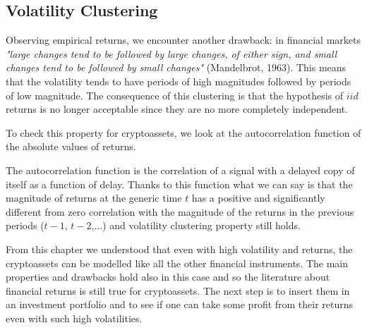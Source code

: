 \subsection{Volatility Clustering}
Observing empirical returns, we encounter another drawback: in financial markets \textit{"large changes tend to be followed by large changes, of either sign, and small changes tend to be followed by small changes"} (Mandelbrot, 1963). This means that the volatility tends to have periods of high magnitudes followed by periods of low magnitude. The consequence of this clustering is that the hypothesis of $iid$ returns is no longer acceptable since they are no more completely independent.

To check this property for cryptoassets, we look at the autocorrelation function of the absolute values of returns.


\begin{table}[H]
    \centering
    \label{tab:my_label}
\end{table}
\bigskip


The autocorrelation function is the correlation of a signal with a delayed copy of itself as a function of delay. Thanks to this function what we can say is that the magnitude of returns at the generic time $t$ has a positive and significantly different from zero correlation with the magnitude of the returns in the previous periods ($t-1$, $t-2$,...) and volatility clustering property still holds.


From this chapter we understood that even with high volatility and returns, the cryptoassets can be modelled like all the other financial instruments. The main properties and drawbacks hold also in this case and so the literature about financial returns is still true for cryptoassets. The next step is to insert them in an investment portfolio and to see if one can take some profit from their returns even with such high volatilities.


\bigskip


